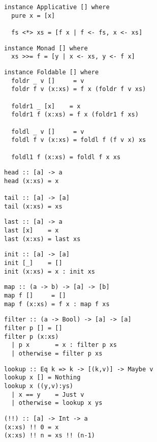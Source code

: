 \begin{multicols}{2}
\begin{verbatim}
instance Applicative [] where
  pure x = [x]

  fs <*> xs = [f x | f <- fs, x <- xs]
\end{verbatim}
	
\begin{verbatim}
instance Monad [] where 
  xs >>= f = [y | x <- xs, y <- f x]
\end{verbatim}
	
\begin{verbatim}
instance Foldable [] where 
  foldr _ v []     = v 
  foldr f v (x:xs) = f x (foldr f v xs)

  foldr1 _ [x]    = x 
  foldr1 f (x:xs) = f x (foldr1 f xs)

  foldl _ v []     = v 
  foldl f v (x:xs) = foldl f (f v x) xs

  foldl1 f (x:xs) = foldl f x xs
\end{verbatim}
	
\begin{verbatim}
head :: [a] -> a 
head (x:xs) = x

tail :: [a] -> [a]
tail (x:xs) = xs
\end{verbatim}
	
\begin{verbatim}
last :: [a] -> a
last [x]    = x
last (x:xs) = last xs
\end{verbatim}
	
\begin{verbatim}
init :: [a] -> [a]
init [_]    = []
init (x:xs) = x : init xs
\end{verbatim}
	
\begin{verbatim}
map :: (a -> b) -> [a] -> [b]
map f []     = []
map f (x:xs) = f x : map f xs
\end{verbatim}
	
\begin{verbatim}
filter :: (a -> Bool) -> [a] -> [a]
filter p [] = []
filter p (x:xs)
  | p x       = x : filter p xs
  | otherwise = filter p xs
\end{verbatim}
	
\begin{verbatim}
lookup :: Eq k => k -> [(k,v)] -> Maybe v
lookup x [] = Nothing
lookup x ((y,v):ys)
  | x == y    = Just v
  | otherwise = lookup x ys
\end{verbatim}
	
\begin{verbatim}
(!!) :: [a] -> Int -> a
(x:xs) !! 0 = x
(x:xs) !! n = xs !! (n-1)
\end{verbatim}
	

\end{multicols}
